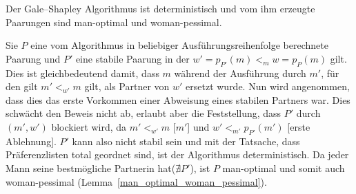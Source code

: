 \begin{Theorem}
\label{mann_optimal}
  Der Gale–Shapley Algorithmus ist deterministisch und vom ihm erzeugte Paarungen sind man-optimal und woman-pessimal.
\end{Theorem}

\begin{Beweis}
\label{mann_optimal_bew}
  Sie $P$ eine vom Algorithmus in beliebiger Ausführungsreihenfolge berechnete Paarung und $P'$ eine stabile Paarung in der $w' = p_{P'}(m) <_{m} w = p_{P}(m)$ gilt. Dies ist gleichbedeutend damit, dass $m$ während der Ausführung durch $m'$, für den gilt $m' <_{w'} m$ gilt, als Partner von $w'$ ersetzt wurde. Nun wird angenommen, dass dies das erste Vorkommen einer Abweisung eines stabilen Partners war. Dies schwächt den Beweis nicht ab, erlaubt aber die Feststellung, dass $P'$ durch $(m',w')$ blockiert wird, da $m' <_{w'} m$ [$m'$] und $w' <_{m'} p_{P'}(m')$ [erste Ablehnung]. $P'$ kann also nicht stabil sein und mit der Tatsache, dass Präferenzlisten total geordnet sind, ist der Algorithmus deterministisch. Da jeder Mann seine bestmögliche Partnerin hat($\nexists P'$), ist $P$ man-optimal und somit auch woman-pessimal (Lemma~\ref{man_optimal_woman_pessimal}).
\end{Beweis}
